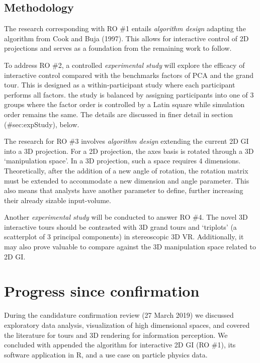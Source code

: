 \documentclass[
  11,
]{article}
\begin{document}
\hypertarget{methodology}{%
\subsection{Methodology}\label{methodology}}

The research corresponding with RO \#1 entails \emph{algorithm design} adapting the algorithm from Cook and Buja (1997). This allows for interactive control of 2D projections and serves as a foundation from the remaining work to follow.

To address RO \#2, a controlled \emph{experimental study} will explore the efficacy of interactive control compared with the benchmarks factors of PCA and the grand tour. This is designed as a within-participant study where each participant performs all factors. the study is balanced by assigning participants into one of 3 groups where the factor order is controlled by a Latin square while simulation order remains the same. The details are discussed in finer detail in section (\#sec:expStudy), below.

The research for RO \#3 involves \emph{algorithm design} extending the current 2D GI into a 3D projection. For a 2D projection, the axes basis is rotated through a 3D `manipulation space'. In a 3D projection, such a space requires 4 dimensions. Theoretically, after the addition of a new angle of rotation, the rotation matrix must be extended to accommodate a new dimension and angle parameter. This also means that analysts have another parameter to define, further increasing their already sizable input-volume.

Another \emph{experimental study} will be conducted to answer RO \#4. The novel 3D interactive tours should be contrasted with 3D grand tours and `triplots' (a scatterplot of 3 principal components) in stereoscopic 3D VR. Additionally, it may also prove valuable to compare against the 3D manipulation space related to 2D GI.

\hypertarget{progress-since-confirmation}{%
\section{Progress since confirmation}\label{progress-since-confirmation}}

During the candidature confirmation review (27 March 2019) we discussed exploratory data analysis, visualization of high dimensional spaces, and covered the literature for tours and 3D rendering for information perception. We concluded with appended the algorithm for interactive 2D GI (RO \#1), its software application in R, and a use case on particle physics data.
\end{document}
